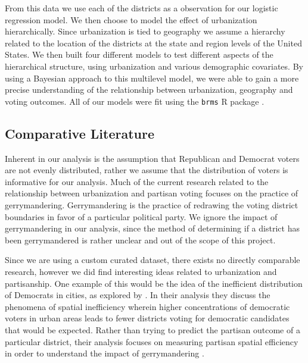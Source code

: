 \documentclass[12pt]{article}
\newcommand{\red}[1]{\textcolor{red}{#1}}
\begin{document}
From this data we use each of the districts as a observation for our logistic regression model. We then choose to model the effect of urbanization hierarchically. Since urbanization is tied to geography we assume a hierarchy related to the location of the districts at the state and region levels of the United States. We then built four different models to test different aspects of the hierarchical structure, using urbanization and various demographic covariates.
By using a Bayesian approach to this multilevel model, we were able to gain a more precise understanding of the relationship between urbanization, geography and voting outcomes. All of our models were fit using the \texttt{brms} R package \parencite{brms}. 




\subsection*{Comparative Literature}
Inherent in our analysis is the assumption that Republican and Democrat voters are not evenly distributed, rather we assume that the distribution of voters is informative for our analysis. Much of the current research related to the relationship between urbanization and partisan voting focuses on the practice of gerrymandering. Gerrymandering is the practice of redrawing the voting district boundaries in favor of a particular political party. We ignore the impact of gerrymandering in our analysis, since the method of determining if a district has been gerrymandered is rather unclear and out of the scope of this project.

Since we are using a custom curated dataset, there exists no directly comparable research, however we did find interesting ideas related to urbanization and partisanship. One example of this would be the idea of the inefficient distribution of Democrats in cities, as explored by \cite{spatialefficency}. In their analysis they discuss the phenomena of spatial inefficiency wherein higher concentrations of democratic voters in urban areas leads to fewer districts voting for democratic candidates that would be expected. Rather than trying to predict the partisan outcome of a particular district, their analysis focuses on measuring partisan spatial efficiency in order to understand the impact of gerrymandering \parencite{spatialefficency}. 
\end{document}
